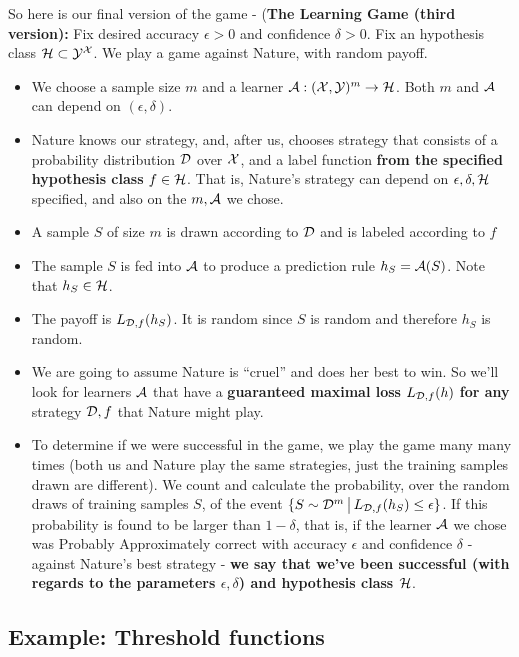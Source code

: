 {So here is our final version of the game - ({\bf The Learning Game (third
	version):} Fix desired accuracy $\epsilon>0$ and confidence $\delta>0$. Fix
an hypothesis class $\mathcal{H} \subset \mathcal{Y} ^{\mathcal{X}}$. 
We play a game against Nature, with random payoff.
\begin{itemize}
	\item We choose a sample size $m$ and a learner $\mathcal{A}:(\mathcal{X},\mathcal{Y})^m \to \mathcal{H}$. 
	Both $m$ and $\mathcal{A}$ can depend on $(\epsilon,\delta)$.
	\item Nature knows our strategy, and, after us, chooses strategy that consists of a probability distribution $\mathcal{D}$ over $\mathcal{X}$, and a label function {\bf from the specified hypothesis class} $f\in\mathcal{H}$. 
	That is, Nature's strategy can depend on $\epsilon,\delta,\mathcal{H}$ specified, and also on the $m,\mathcal{A}$ we chose. 
	\item A sample $S$ of size $m$ is drawn according to $\mathcal{D}$ and is labeled
	according to $f$
	\item The sample $S$ is fed into $\mathcal{A}$ to produce a prediction rule
	$h_S=\mathcal{A}(S)$. Note that $h_S\in\mathcal{H}$.
	\item The payoff is $L_{\mathcal{D},f}(h_S)$. It is random since $S$ is random and
	therefore $h_S$ is random.
	\item We are going to assume Nature is ``cruel'' and does her best to win.
	So we'll look for learners $\mathcal{A}$ that have a {\bf guaranteed maximal 
		loss} $L_{\mathcal{D},f}(h)$ {\bf for any} strategy $\mathcal{D},f$ that Nature might play.
	\item To determine if we were successful in the game, we play the game many many times 
	(both us and Nature play the same strategies, just the training samples drawn are different).
	We count and calculate the probability, over the random draws of training samples $S$, of the event
	$\{ S \sim \mathcal{D} ^m \,\big |\,L_{\mathcal{D},f}(h_S)\leq \epsilon \}$. If this probability is found to be 
	larger than $1-\delta$, that is, if 
	the learner $\mathcal{A}$ we chose was Probably Approximately correct with accuracy $\epsilon$ and confidence $\delta$ - against Nature's best strategy - {\bf we say that we've been successful (with regards to the parameters $\epsilon,\delta$) and hypothesis class $\mathcal{H}$}.
\end{itemize}


\subsection{Example: Threshold functions}



}
